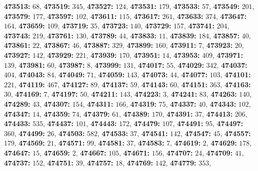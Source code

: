 \textsf{\bfseries 473513:} $68$, \textsf{\bfseries 473519:} $345$, \textsf{\bfseries 473527:} $124$, \textsf{\bfseries 473531:} $179$, \textsf{\bfseries 473533:} $57$, \textsf{\bfseries 473549:} $201$, \textsf{\bfseries 473579:} $177$, \textsf{\bfseries 473597:} $102$, \textsf{\bfseries 473611:} $115$, \textsf{\bfseries 473617:} $261$, \textsf{\bfseries 473633:} $374$, \textsf{\bfseries 473647:} $164$, \textsf{\bfseries 473659:} $109$, \textsf{\bfseries 473719:} $35$, \textsf{\bfseries 473723:} $140$, \textsf{\bfseries 473729:} $157$, \textsf{\bfseries 473741:} $204$, \textsf{\bfseries 473743:} $219$, \textsf{\bfseries 473761:} $130$, \textsf{\bfseries 473789:} $44$, \textsf{\bfseries 473833:} $11$, \textsf{\bfseries 473839:} $184$, \textsf{\bfseries 473857:} $40$, \textsf{\bfseries 473861:} $22$, \textsf{\bfseries 473867:} $46$, \textsf{\bfseries 473887:} $329$, \textsf{\bfseries 473899:} $160$, \textsf{\bfseries 473911:} $7$, \textsf{\bfseries 473923:} $20$, \textsf{\bfseries 473927:} $142$, \textsf{\bfseries 473929:} $221$, \textsf{\bfseries 473939:} $170$, \textsf{\bfseries 473951:} $14$, \textsf{\bfseries 473953:} $409$, \textsf{\bfseries 473971:} $139$, \textsf{\bfseries 473981:} $60$, \textsf{\bfseries 473987:} $8$, \textsf{\bfseries 473999:} $131$, \textsf{\bfseries 474017:} $55$, \textsf{\bfseries 474029:} $342$, \textsf{\bfseries 474037:} $404$, \textsf{\bfseries 474043:} $84$, \textsf{\bfseries 474049:} $71$, \textsf{\bfseries 474059:} $143$, \textsf{\bfseries 474073:} $44$, \textsf{\bfseries 474077:} $103$, \textsf{\bfseries 474101:} $221$, \textsf{\bfseries 474119:} $467$, \textsf{\bfseries 474127:} $89$, \textsf{\bfseries 474137:} $59$, \textsf{\bfseries 474143:} $60$, \textsf{\bfseries 474151:} $363$, \textsf{\bfseries 474163:} $30$, \textsf{\bfseries 474169:} $7$, \textsf{\bfseries 474197:} $50$, \textsf{\bfseries 474211:} $143$, \textsf{\bfseries 474223:} $3$, \textsf{\bfseries 474241:} $83$, \textsf{\bfseries 474263:} $140$, \textsf{\bfseries 474289:} $43$, \textsf{\bfseries 474307:} $154$, \textsf{\bfseries 474311:} $166$, \textsf{\bfseries 474319:} $75$, \textsf{\bfseries 474337:} $40$, \textsf{\bfseries 474343:} $102$, \textsf{\bfseries 474347:} $14$, \textsf{\bfseries 474359:} $74$, \textsf{\bfseries 474379:} $61$, \textsf{\bfseries 474389:} $170$, \textsf{\bfseries 474391:} $37$, \textsf{\bfseries 474413:} $206$, \textsf{\bfseries 474433:} $535$, \textsf{\bfseries 474437:} $101$, \textsf{\bfseries 474443:} $172$, \textsf{\bfseries 474479:} $107$, \textsf{\bfseries 474491:} $95$, \textsf{\bfseries 474497:} $360$, \textsf{\bfseries 474499:} $26$, \textsf{\bfseries 474503:} $582$, \textsf{\bfseries 474533:} $37$, \textsf{\bfseries 474541:} $142$, \textsf{\bfseries 474547:} $45$, \textsf{\bfseries 474557:} $179$, \textsf{\bfseries 474569:} $21$, \textsf{\bfseries 474571:} $99$, \textsf{\bfseries 474581:} $37$, \textsf{\bfseries 474583:} $7$, \textsf{\bfseries 474619:} $2$, \textsf{\bfseries 474629:} $178$, \textsf{\bfseries 474647:} $15$, \textsf{\bfseries 474659:} $2$, \textsf{\bfseries 474667:} $105$, \textsf{\bfseries 474671:} $156$, \textsf{\bfseries 474707:} $24$, \textsf{\bfseries 474709:} $41$, \textsf{\bfseries 474737:} $152$, \textsf{\bfseries 474751:} $39$, \textsf{\bfseries 474757:} $18$, \textsf{\bfseries 474769:} $142$, \textsf{\bfseries 474779:} $353$, 
